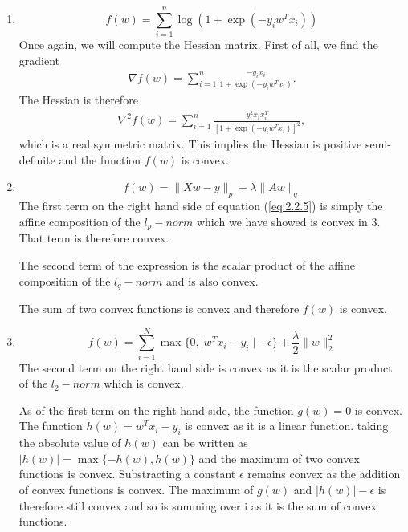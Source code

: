 \begin{enumerate}
\par\item\begin{equation}
f(w) = \sum_{i=1}^{n}\log\left(1+\exp\left(-y_{i}w^{T}x_{i}\right)\right)
\end{equation}
Once again, we will compute the Hessian matrix.  First of all, we find the gradient
\begin{align}
\nabla f(w)=\sum_{i=1}^{n}\frac{-y_{i}x_{i}}{1+\exp\left(-y_{i}w^{T}x_{i}\right)}.
\end{align}
The Hessian is therefore
\begin{align}
\nabla^{2} f(w)=\sum_{i=1}^{n}\frac{y_{i}^{2}x_{i}x_{i}^{T}}{\left[1+\exp\left(-y_{i}w^{T}x_{i}\right)\right]^{2}},
\end{align}
which is a real symmetric matrix.  This implies the Hessian is positive semi-definite and the function $f(w)$ is convex.

\par\item\begin{equation}\label{eq:2.2.5}
f(w) = \|Xw-y\|_{p}+\lambda \| Aw\|_{q}
\end{equation}
The first term on the right hand side of equation (\ref{eq:2.2.5}) is simply the affine composition of the $l_{p}-norm$ which we have showed is convex in 3.  That term is therefore convex.  
\par The second term of the expression is the scalar product of the affine composition of the $l_{q}-norm$ and is also convex.
\par The sum of two convex functions is convex and therefore $f(w)$ is convex.

\par\item\begin{equation}
f(w) = \sum_{i=1}^{N}\max\{0,\mid w^{T}x_{i}-y_{i}\mid -\epsilon\}+\frac{\lambda}{2}\|w\|_{2}^{2}
\end{equation}
The second term on the right hand side is convex as it is the scalar product of the $l_{2}-norm$ which is convex.

\par As of the first term on the right hand side, the function $g(w) = 0$ is convex.  The function $h(w) = w^{T}x_{i}-y_{i}$ is convex as it is a linear function.  taking the absolute value of $h(w)$ can be written as $|h(w)| = \max\{-h(w),h(w)\}$ and the maximum of two convex functions is convex.  Substracting a constant $\epsilon$ remains convex as the addition of convex functions is convex.  The maximum of $g(w)$ and $|h(w)|-\epsilon$ is therefore still convex and so is summing over i as it is the sum of convex functions.


\end{enumerate}
